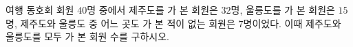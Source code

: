 여행 동호회 회원 $40$명 중에서 제주도를 가 본 회원은 $32$명, 울릉도를 가 본 회원은 $15$명, 제주도와 울릉도 중 어느 곳도 가 본 적이 없는 회원은 $7$명이었다. 이때 제주도와 울릉도를 모두 가 본 회원 수를 구하시오.

